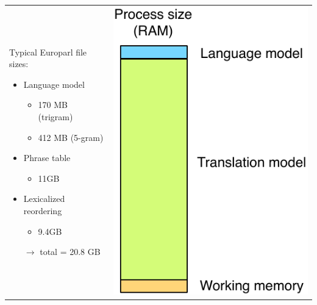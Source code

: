 \documentclass[landscape]{uedslides2C}
\begin{document}

\begin{tabular}{p{10cm}c}
\vspace{-11cm}
Typical Europarl file sizes:
\begin{itemize} \itemsep -1mm
  \item Language model \vspace{-3mm}
	\begin{itemize}
  	\item  170 MB (trigram)
	\item 412 MB (5-gram)
	\end{itemize}
  \item Phrase table \vspace{-3mm}
	\begin{itemize}
  	\item  11GB
	\end{itemize}
  \item Lexicalized reordering \vspace{-3mm}
	\begin{itemize}
  	\item  9.4GB
	\end{itemize}
   \item[$\rightarrow$] total = 20.8 GB
\end{itemize}
&
\includegraphics[scale=1.4]{less-memory-europarl.pdf}
\end{tabular}
\end{document}
